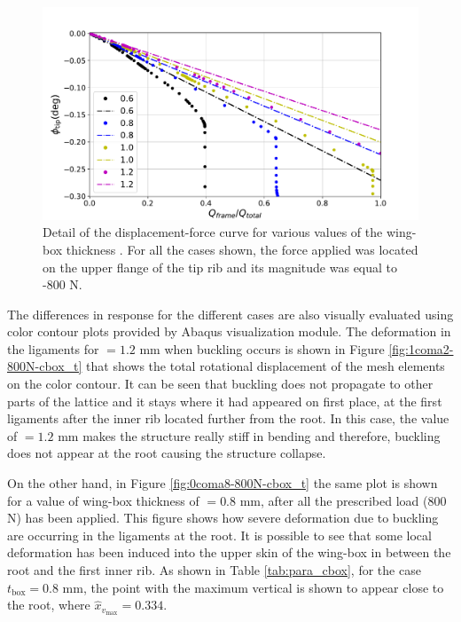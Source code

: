     \begin{figure}[!htpb] %
      \centering
      \includegraphics[width=0.8 \textwidth]{../figures/result-sim/cbox/force_displacement-close}
      \caption[Detail of the displacement-force curve for various values of the wing-box thickness]{Detail of the displacement-force curve for various values of the wing-box thickness \boxt. For all the cases shown, the force applied was located on the upper flange of the tip rib and its magnitude was equal to -800 N.}\label{fig:forceDisplacement-close-Cbox_t}
    \end{figure}

    The differences in response for the different cases are also visually evaluated using color contour plots provided by Abaqus visualization module. The deformation in the ligaments for \boxt$= 1.2$ mm when buckling occurs is shown in Figure \ref{fig:1coma2-800N-cbox_t} that shows the total rotational displacement of the mesh elements on the color contour. It can be seen that buckling does not propagate to other parts of the lattice and it stays where it had appeared on first place, at the first ligaments after the inner rib located further from the root. In this case, the value of \boxt$= 1.2$ mm makes the structure really stiff in bending and therefore, buckling does not appear at the root causing the structure collapse.

    On the other hand, in Figure \ref{fig:0coma8-800N-cbox_t} the same plot is shown for a value of wing-box thickness of \boxt$= 0.8$ mm, after all the prescribed load (800 N) has been applied. This figure shows how severe deformation due to buckling are occurring in the ligaments at the root. It is possible to see that some local deformation has been induced into the upper skin of the wing-box in between the root and the first inner rib. As shown in Table \ref{tab:para_cbox}, for the case $t_{\mathrm{box}} = 0.8$ mm, the point with the maximum vertical is shown to appear close to the root, where $\hat{x}_{v_{\mathrm{max}}} = 0.334$.

